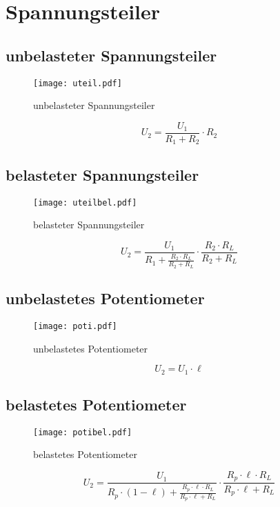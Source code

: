 



\section{Spannungsteiler}

\subsection{unbelasteter Spannungsteiler}
\begin{figure}[h!]
	\centering
	\texttt{[image: uteil.pdf]}
	\caption{unbelasteter Spannungsteiler}
	\label{sch:uteil}
\end{figure}
\[ U_2 = \frac{U_1}{R_1 + R_2} \cdot R_2 \]

\subsection{belasteter Spannungsteiler}
\begin{figure}[h!]
	\centering
	\texttt{[image: uteilbel.pdf]}
	\caption{belasteter Spannungsteiler}
	\label{sch:uteilbel}
\end{figure}
\[ U_2 = \frac{U_1}{R_1 + \frac{R_2 \cdot R_L}{R_2 + R_L}} \cdot \frac{R_2 \cdot R_L}{R_2 + R_L} \]

\newpage
\subsection{unbelastetes Potentiometer}
\begin{figure}[h!]
	\centering
	\texttt{[image: poti.pdf]}
	\caption{unbelastetes Potentiometer}
	\label{sch:poti}
\end{figure}
\[ U_2 = U_1 \cdot \ell \]

\subsection{belastetes Potentiometer}
\begin{figure}[h!]
	\centering
	\texttt{[image: potibel.pdf]}
	\caption{belastetes Potentiometer}
	\label{sch:potibel}
\end{figure}
\[ U_2 = \frac{U_1}{R_p \cdot (1 - \ell) + \frac{R_p \cdot \ell \cdot R_L}{R_p \cdot \ell + R_L}} \cdot \frac{R_p \cdot \ell \cdot R_L}{R_p \cdot \ell + R_L} \]
